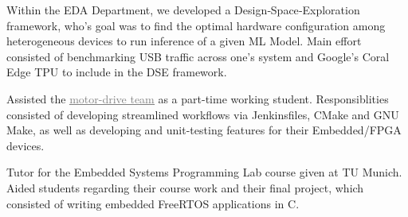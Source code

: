 \documentclass[10pt,a4paper,ragged2e,withhyper]{altacv}
\begin{document}
\begin{paracol}{2}
%
%


\medskip

\nocite{*}

\switchcolumn
{}

Within the EDA Department, we developed a Design‑Space‑Exploration framework, 
who's goal was to find the optimal hardware configuration among heterogeneous devices to run inference of a given ML Model.
Main effort consisted of benchmarking USB traffic across one's system and Google's Coral Edge TPU to include in the DSE framework.

\divider

Assisted the \href{https://molabo.com/unternehmen/}{{\textcolor{gray}{\underline{motor-drive team}}}}
as a part-time working student. Responsiblities consisted of
developing streamlined workflows via Jenkinsfiles, CMake and GNU Make, as well as 
developing and unit-testing features for their Embedded/FPGA devices.

\divider

Tutor for the Embedded Systems Programming Lab course given at TU Munich.
Aided students regarding their course work and their final project, which 
consisted of writing embedded FreeRTOS applications in C.


\\
\\

\medskip


\\

\end{paracol}
\end{document}
